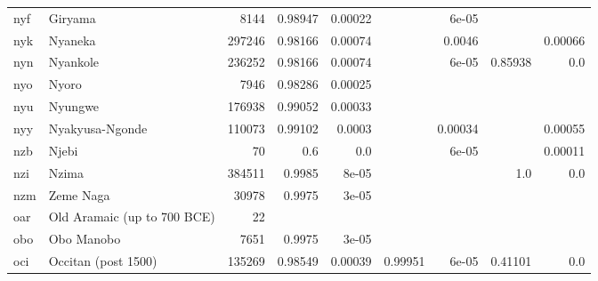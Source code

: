 \documentclass[11pt]{article}
\begin{document}
\begin{table*}[h]
{\begin{tabular}{llrrrrrrr}
nyf         & Giryama         & 8144         & 0.98947         & 0.00022         &          & 6e-05         &          &          \\

nyk         & Nyaneka         & 297246         & 0.98166         & 0.00074         &          & 0.0046         &          & 0.00066         \\

nyn         & Nyankole         & 236252         & 0.98166         & 0.00074         &          & 6e-05         & 0.85938         & 0.0         \\

nyo         & Nyoro         & 7946         & 0.98286         & 0.00025         &          &          &          &          \\

nyu         & Nyungwe         & 176938         & 0.99052         & 0.00033         &          &          &          &          \\

nyy         & Nyakyusa-Ngonde         & 110073         & 0.99102         & 0.0003         &          & 0.00034         &          & 0.00055         \\

nzb         & Njebi         & 70         & 0.6         & 0.0         &          & 6e-05         &          & 0.00011         \\

nzi         & Nzima         & 384511         & 0.9985         & 8e-05         &          &          & 1.0         & 0.0         \\

nzm         & Zeme Naga         & 30978         & 0.9975         & 3e-05         &          &          &          &          \\

oar         & Old Aramaic (up to 700 BCE)         & 22         &          &          &          &          &          &          \\

obo         & Obo Manobo         & 7651         & 0.9975         & 3e-05         &          &          &          &          \\

oci         & Occitan (post 1500)         & 135269         & 0.98549         & 0.00039         & 0.99951         & 6e-05         & 0.41101         & 0.0         \\


\end{tabular}}
\end{table*}
\end{document}
